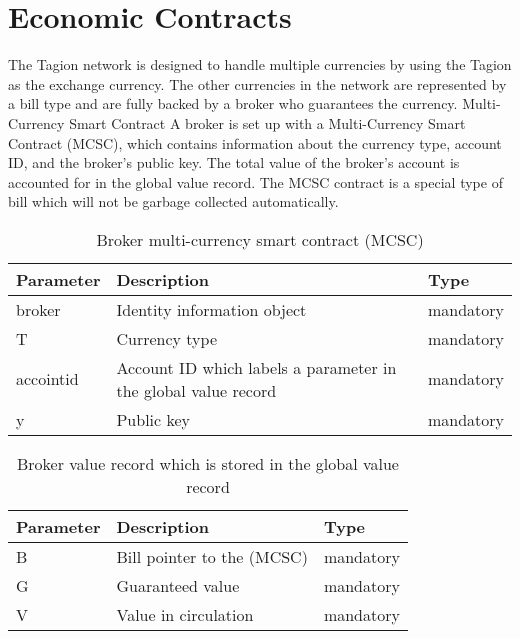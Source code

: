 \section{Economic Contracts}
The Tagion network is designed to handle multiple currencies by using the Tagion as the exchange currency.
The other currencies in the network are represented by a bill type and are fully backed by a broker who guarantees the currency.
Multi-Currency Smart Contract
A broker is set up with a Multi-Currency Smart Contract (MCSC), which contains information about the currency type, account ID, and the broker’s public key. The total value of the broker's account is accounted for in the global value record. The MCSC contract is a special type of bill which will not be garbage collected automatically. 

\begin{table}[H]
\begin{center}
\begin{tabular}{|p{2cm}|p{7cm}|p{2cm}|}
\hline
Parameter & Description & Type \\
\hline
broker & Identity information object & mandatory \\
\hline
T & Currency type & mandatory \\
\hline
accointid & Account ID which labels a parameter in the global value record & mandatory \\
\hline
y & Public key & mandatory \\
\hline
\end{tabular}
\end{center}
\caption{Broker multi-currency smart contract (MCSC)}
\label{tab:MCSC}
\end{table}

\begin{table}[H]
\begin{center}
\begin{tabular}{|p{2cm}|p{7cm}|p{2cm}|}
\hline
Parameter & Description & Type \\
\hline
B & Bill pointer to the (MCSC) & mandatory \\
\hline
G & Guaranteed value & mandatory \\
\hline
V & Value in circulation & mandatory \\
\hline
\end{tabular}
\end{center}
\caption{Broker value record which is stored in the global value record}
\label{tab:broker_value_record}
\end{table}

